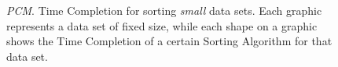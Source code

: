\begin{figure}[!ht]
	\centering
  	\hspace*{20pt}  
  	
	\caption{\textit{PCM}. Time Completion for sorting \textit{small} data sets. Each graphic represents a data set of fixed size, while each shape on a graphic shows the Time Completion of a certain Sorting Algorithm for that data set.}
	\label{NxTxA-small}
\end{figure} 

